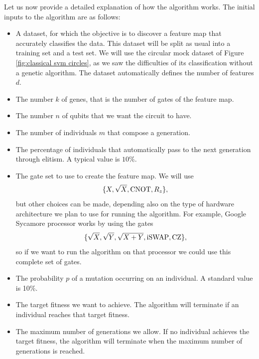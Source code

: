 \documentclass[12pt]{article}
\begin{document}
Let us now provide a detailed explanation of how the algorithm works. The initial inputs to the algorithm are as follows:
\begin{itemize} 
    \item A dataset, for which the objective is to discover a feature map that accurately classifies the data. This dataset will be split as usual into a training set and a test set. We will use the circular mock dataset of Figure \ref{fig:classical svm circles}, as we saw the difficulties of its classification without a genetic algorithm. The dataset automatically defines the number of features $d$.  
    \item The number $k$ of genes, that is the number of gates of the feature map. 
    \item The number $n$ of qubits that we want the circuit to have.
    \item The number of individuals $m$ that compose a generation.
    \item The percentage of individuals that automatically pass to the next generation through elitism. A typical value is $10\%$.
    \item The gate set to use to create the feature map. We will use $$\{X, \sqrt{X}, \textup{CNOT}, R_z\},$$ but other choices can be made, depending also on the type of hardware architecture we plan to use for running the algorithm. For example, Google Sycamore processor works by using the gates $$\{\sqrt{X}, \sqrt{Y},\sqrt{X+Y}, \textup{iSWAP}, \text{CZ}\},$$ so if we want to run the algorithm on that processor we could use this complete set of gates. 
    \item The probability $p$ of a mutation occurring on an individual. A standard value is 10\%.
    \item The target fitness we want to achieve. The algorithm will terminate if an individual reaches that target fitness. 
    \item The maximum number of generations we allow. If no individual achieves the target fitness, the algorithm will terminate when the maximum number of generations is reached. 
\end{itemize}
\end{document}
